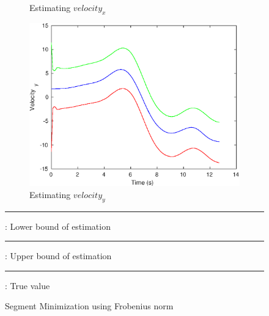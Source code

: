 \begin{figure}
\begin{subfigure}{.5\textwidth}
\caption{Estimating $velocity_x$}
\end{subfigure}
\begin{subfigure}{.5\textwidth}
\centering
\includegraphics[width=.8\linewidth]{figures/s_caVelocity_y}
\caption{Estimating $velocity_y$}
\end{subfigure}
{\color{red}\rule{.1\linewidth}{1pt}} : Lower bound of estimation\\
{\color{green}\rule{.1\linewidth}{1pt}} : Upper bound of estimation\\
{\color{blue}\rule{.1\linewidth}{1pt}} : True value
\caption{Segment Minimization using Frobenius norm}
\end{figure}


